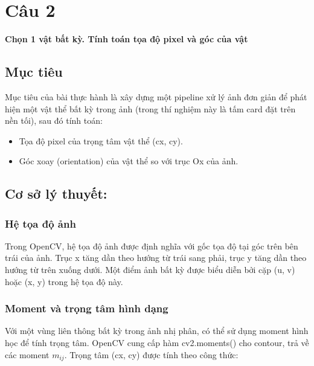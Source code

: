 \section{Câu 2}
    \hspace*{0.6cm}\textbf{Chọn 1 vật bất kỳ. Tính toán tọa độ pixel và góc của vật}
    \subsection{Mục tiêu}

        \hspace*{0.6cm}Mục tiêu của bài thực hành là xây dựng một pipeline xử lý ảnh đơn giản để phát hiện một vật thể bất kỳ trong ảnh (trong thí nghiệm này là tấm card đặt trên nền tối), sau đó tính toán:

        \begin{itemize}
            \item Tọa độ pixel của trọng tâm vật thể (cx, cy).
            \item Góc xoay (orientation) của vật thể so với trục Ox của ảnh.
        \end{itemize}

    \subsection{Cơ sở lý thuyết:}

        \subsubsection{Hệ tọa độ ảnh}

            \hspace*{0.6cm}Trong OpenCV, hệ tọa độ ảnh được định nghĩa với gốc tọa độ tại góc trên bên trái của ảnh. Trục x tăng dần theo hướng từ trái sang phải, trục y tăng dần theo hướng từ trên xuống dưới. Một điểm ảnh bất kỳ được biểu diễn bởi cặp (u, v) hoặc (x, y) trong hệ tọa độ này.

        \subsubsection{Moment và trọng tâm hình dạng}

            \hspace*{0.6cm}Với một vùng liên thông bất kỳ trong ảnh nhị phân, có thể sử dụng moment hình học để tính trọng tâm. OpenCV cung cấp hàm cv2.moments() cho contour, trả về các moment $m_{ij}$. Trọng tâm (cx, cy) được tính theo công thức:

